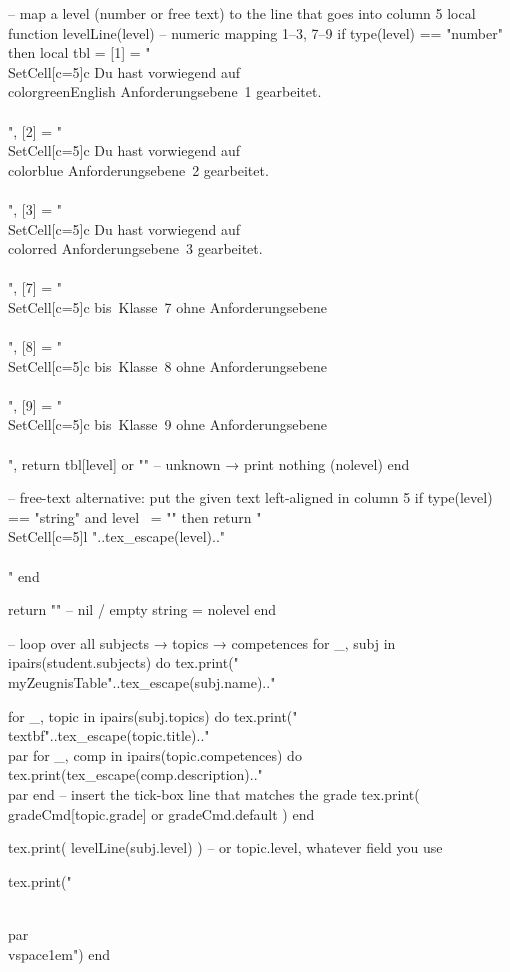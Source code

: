 \begin{luacode*}
	-- map a level (number or free text) to the line that goes into column 5
	local function levelLine(level)
		-- numeric mapping 1–3, 7–9
		if type(level) == "number" then
			local tbl = {
				[1] = "\\SetCell[c=5]{c} Du hast vorwiegend auf {\\color{greenEnglish} Anforderungsebene~1} gearbeitet.\\\\",
				[2] = "\\SetCell[c=5]{c} Du hast vorwiegend auf {\\color{blue} Anforderungsebene~2} gearbeitet.\\\\",
				[3] = "\\SetCell[c=5]{c} Du hast vorwiegend auf {\\color{red} Anforderungsebene~3} gearbeitet.\\\\",
				[7] = "\\SetCell[c=5]{c} bis~Klasse~7 ohne Anforderungsebene\\\\",
				[8] = "\\SetCell[c=5]{c} bis~Klasse~8 ohne Anforderungsebene\\\\",
				[9] = "\\SetCell[c=5]{c} bis~Klasse~9 ohne Anforderungsebene\\\\",
			}
			return tbl[level] or ""          -- unknown → print nothing (nolevel)
		end
		
		-- free-text alternative: put the given text left-aligned in column 5
		if type(level) == "string" and level ~= "" then
			return "\\SetCell[c=5]{l} "..tex_escape(level).."\\\\"
		end
		
		return ""                          -- nil / empty string  =  nolevel
	end

	
	-- loop over all subjects → topics → competences
	for _, subj in ipairs(student.subjects) do
	tex.print("\\myZeugnisTable{"..tex_escape(subj.name).."}{%
		
		for _, topic in ipairs(subj.topics) do
			tex.print("\\textbf{"..tex_escape(topic.title).."}\\par%
			for _, comp in ipairs(topic.competences) do
				tex.print(tex_escape(comp.description).."\\par%
			end
			-- insert the tick-box line that matches the grade
			tex.print( gradeCmd[topic.grade] or gradeCmd.default )
		end
		
		tex.print( levelLine(subj.level) )   -- or topic.level, whatever field you use
		
		tex.print("}\\par\\vspace{1em}")
	end
\end{luacode*}
